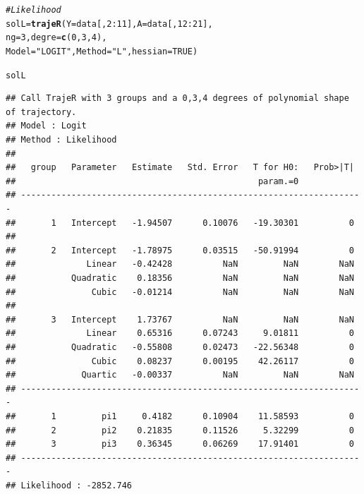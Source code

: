 \documentclass{article}\usepackage[]{graphicx}\usepackage[]{color}
\makeatletter
\newcommand{\hlnum}[1]{\textcolor[rgb]{0.686,0.059,0.569}{#1}}%
\newcommand{\hlstr}[1]{\textcolor[rgb]{0.192,0.494,0.8}{#1}}%
\newcommand{\hlcom}[1]{\textcolor[rgb]{0.678,0.584,0.686}{\textit{#1}}}%
\newcommand{\hlopt}[1]{\textcolor[rgb]{0,0,0}{#1}}%
\newcommand{\hlstd}[1]{\textcolor[rgb]{0.345,0.345,0.345}{#1}}%
\newcommand{\hlkwb}[1]{\textcolor[rgb]{0.69,0.353,0.396}{#1}}%
\newcommand{\hlkwc}[1]{\textcolor[rgb]{0.333,0.667,0.333}{#1}}%
\newcommand{\hlkwd}[1]{\textcolor[rgb]{0.737,0.353,0.396}{\textbf{#1}}}%
\newenvironment{kframe}{%
 \def\at@end@of@kframe{}%
 \ifinner\ifhmode%
  \def\at@end@of@kframe{\end{minipage}}%
  \begin{minipage}{\columnwidth}%
 \fi\fi%
 \def\FrameCommand##1{\hskip\@totalleftmargin \hskip-\fboxsep
 \colorbox{shadecolor}{##1}\hskip-\fboxsep
     \hskip-\linewidth \hskip-\@totalleftmargin \hskip\columnwidth}%
 \MakeFramed {\advance\hsize-\width
   \@totalleftmargin\z@ \linewidth\hsize
   \@setminipage}}%
 {\par\unskip\endMakeFramed%
 \at@end@of@kframe}
\newenvironment{knitrout}{}{} %
\makeatother
\begin{document}
\begin{knitrout}
\color{fgcolor}\begin{kframe}
\begin{alltt}
\hlcom{# Likelihood}
\hlstd{solL} \hlkwb{=} \hlkwd{trajeR}\hlstd{(}\hlkwc{Y} \hlstd{= data[,}\hlnum{2}\hlopt{:}\hlnum{11}\hlstd{],} \hlkwc{A} \hlstd{= data[,}\hlnum{12}\hlopt{:}\hlnum{21}\hlstd{],}
              \hlkwc{ng} \hlstd{=} \hlnum{3}\hlstd{,} \hlkwc{degre} \hlstd{=} \hlkwd{c}\hlstd{(}\hlnum{0}\hlstd{,}\hlnum{3}\hlstd{,}\hlnum{4}\hlstd{),}
              \hlkwc{Model} \hlstd{=} \hlstr{"LOGIT"}\hlstd{,} \hlkwc{Method} \hlstd{=} \hlstr{"L"}\hlstd{,} \hlkwc{hessian} \hlstd{=} \hlnum{TRUE}\hlstd{)}
\end{alltt}
\end{kframe}
\end{knitrout}
\begin{knitrout}
\color{fgcolor}\begin{kframe}
\begin{alltt}
\hlstd{solL}
\end{alltt}
\begin{verbatim}
## Call TrajeR with 3 groups and a 0,3,4 degrees of polynomial shape of trajectory.
## Model : Logit
## Method : Likelihood 
##  
##   group   Parameter   Estimate   Std. Error   T for H0:   Prob>|T|  
##                                                param.=0             
## --------------------------------------------------------------------
##       1   Intercept   -1.94507      0.10076   -19.30301          0  
##                                                                     
##       2   Intercept   -1.78975      0.03515   -50.91994          0  
##              Linear   -0.42428          NaN         NaN        NaN  
##           Quadratic    0.18356          NaN         NaN        NaN  
##               Cubic   -0.01214          NaN         NaN        NaN  
##                                                                     
##       3   Intercept    1.73767          NaN         NaN        NaN  
##              Linear    0.65316      0.07243     9.01811          0  
##           Quadratic   -0.55808      0.02473   -22.56348          0  
##               Cubic    0.08237      0.00195    42.26117          0  
##             Quartic   -0.00337          NaN         NaN        NaN  
## --------------------------------------------------------------------
##       1         pi1     0.4182      0.10904    11.58593          0  
##       2         pi2    0.21835      0.11526     5.32299          0  
##       3         pi3    0.36345      0.06269    17.91401          0  
## --------------------------------------------------------------------
## Likelihood : -2852.746
\end{verbatim}
\end{kframe}
\end{knitrout}
\end{document}
